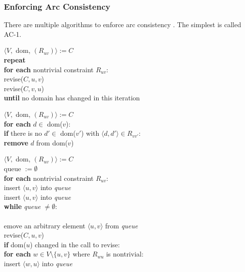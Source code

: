 \subsubsection{Enforcing Arc Consistency}

There are multiple algorithms to enforce arc consistency \cite{arc_studied:1977} \cite{arc_again:1994}. The simplest is called AC-1.

\begin{tcolorbox}[title={\textbf{function} AC-1($C$):}]
	$\langle V,$ dom, $(R_{uv})\rangle := C$ \\
	\textbf{repeat} \\
	\textbf{for each} nontrivial constraint $R_{uv}$: \\
	revise($C, u, v$) \\
	revise($C, v, u$) \\
	\textbf{until} no domain has changed in this iteration
\end{tcolorbox}


\begin{tcolorbox}[title={\textbf{function} revise($C,v,v'$):}]
	$\langle V,$ dom, $(R_{uv})\rangle := C$ \\
	\textbf{for each} $d \in$ dom($v$): \\
	\textbf{if} there is no $d' \in$ dom($v'$) with $\langle d, d' \rangle \in R_{vv'}$: \\
	\textbf{remove} $d$ from dom($v$)
\end{tcolorbox}

\begin{tcolorbox}[title={\textbf{function} AC-3($C$):}]
	$\langle V,$ dom, $(R_{uv})\rangle := C$ \\
	queue $:= \emptyset$ \\
	\textbf{for each} nontrivial constraint $R_{uv}$: \\
	insert $\langle u, v \rangle$ into \textit{queue} \\
	insert $\langle u, v \rangle$ into \textit{queue} \\

	\textbf{while} \textit{queue} $\neq \emptyset$: \\
	\\emove an arbitrary element $\langle u, v \rangle$ from \textit{queue} \\
	revise($C, u, v$) \\
	\textbf{if} dom($u$) changed in the call to revise: \\
	\textbf{for each} $w \in V \setminus \{u,v\}$ where $R_{wu}$ is nontrivial: \\
	insert $\langle w, u \rangle$ into \textit{queue}
\end{tcolorbox}

